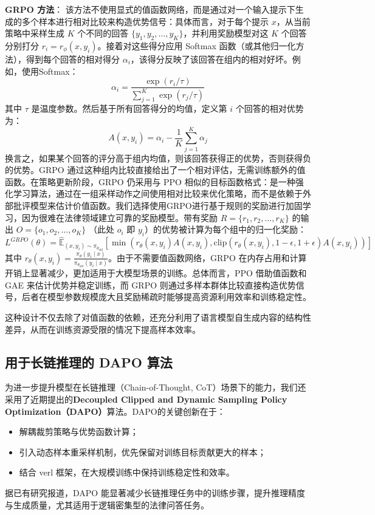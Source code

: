 \documentclass{pkuthesis}
\begin{document}
\textbf{GRPO 方法}： 该方法不使用显式的值函数网络，而是通过对一个输入提示下生成的多个样本进行相对比较来构造优势信号：具体而言，对于每个提示 $x$，从当前策略中采样生成 $K$ 个不同的回答 $\{y_1, y_2, \dots, y_K\}$，并利用奖励模型对这 $K$ 个回答分别打分 $r_i = r_{\phi}(x, y_i)$。接着对这些得分应用 Softmax 函数（或其他归一化方法），得到每个回答的相对得分 $\alpha_i$，该得分反映了该回答在组内的相对好坏。例如，使用Softmax：
$$ \alpha_i = \frac{\exp(r_i / \tau)}{\sum_{j=1}^K \exp(r_j / \tau)} $$
其中 $\tau$ 是温度参数。然后基于所有回答得分的均值，定义第 $i$ 个回答的相对优势为：
$$ A(x, y_i) = \alpha_i - \frac{1}{K} \sum_{j=1}^K \alpha_j $$
换言之，如果某个回答的评分高于组内均值，则该回答获得正的优势，否则获得负的优势。GRPO 通过这种组内比较直接给出了一个相对评估，无需训练额外的值函数。在策略更新阶段，GRPO 仍采用与 PPO 相似的目标函数格式：是一种强化学习算法，通过在一组采样动作之间使用相对比较来优化策略，而不是依赖于外部批评模型来估计价值函数。我们选择使用GRPO进行基于规则的奖励进行加固学习，因为很难在法律领域建立可靠的奖励模型。带有奖励 $R = \{r_1, r_2, \dots, r_K\}$ 的输出 $O = \{o_1, o_2, \dots, o_K\}$ （此处 $o_i$ 即 $y_i$）的优势被计算为每个组中的归一化奖励：
$$ L^{GRPO}(\theta) = \hat{\mathbb{E}}_{(x, y_i) \sim \pi_{\theta_{\text{old}}}} \left[ \min(r_{\theta}(x,y_i)A(x,y_i), \text{clip}(r_{\theta}(x,y_i), 1-\epsilon, 1+\epsilon)A(x,y_i)) \right] $$
其中 $r_{\theta}(x, y_i) = \frac{\pi_{\theta}(y_i \mid x)}{\pi_{\theta_{\text{old}}}(y_i \mid x)}$。由于不需要值函数网络，GRPO 在内存占用和计算开销上显著减少，更加适用于大模型场景的训练。总体而言，PPO 借助值函数和 GAE 来估计优势并稳定训练，而 GRPO 则通过多样本群体比较直接构造优势信号，后者在模型参数规模庞大且奖励稀疏时能够提高资源利用效率和训练稳定性。

这种设计不仅去除了对值函数的依赖，还充分利用了语言模型自生成内容的结构性差异，从而在训练资源受限的情况下提高样本效率。

\subsection{用于长链推理的 DAPO 算法}
为进一步提升模型在长链推理（Chain-of-Thought, CoT）场景下的能力，我们还采用了近期提出的\textbf{Decoupled Clipped and Dynamic Sampling Policy Optimization（DAPO）}算法。DAPO的关键创新在于：
\begin{itemize}
    \item 解耦裁剪策略与优势函数计算；
    \item 引入动态样本重采样机制，优先保留对训练目标贡献更大的样本；
    \item 结合 verl 框架，在大规模训练中保持训练稳定性和效率。
\end{itemize}
据已有研究报道，DAPO 能显著减少长链推理任务中的训练步骤，提升推理精度与生成质量，尤其适用于逻辑密集型的法律问答任务。
\end{document}
